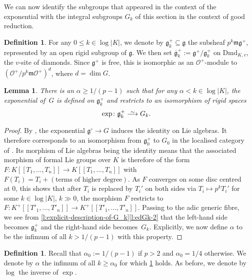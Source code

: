 \documentclass[10pt,a4paper]{article}
\newtheorem{Lemma}[thm]{Lemma}
\theoremstyle{definition}
\newtheorem{Definition}[thm]{Definition}
\theoremstyle{remark}
\newcommand{\lra}{\longrightarrow}
\newcommand*{\lowsim}{\vbox to 0pt{\vss\hbox{$\scriptstyle\sim$}\vskip-2pt}}
\newcommand*{\longisomarrow}{\stackrel{\lowsim}{\lra}}
\renewcommand{\O}{\mathcal{O}}
\newcommand{\m}{\mathfrak{m}}
\newcommand{\mg}{\mathfrak{g}}
\newcommand{\Dmd}{\mathrm{Dmd}}
\numberwithin{equation}{section}
\begin{document}
We can now identify  the subgroups that appeared in the context of the exponential with the integral subgroups $G_k$ of this section in the context of good reduction. 

\begin{Definition}\label{d:mg-plus_k}
	For any $0\leq k \in \log|K|$,
	we denote by $\mathfrak g_k^+\subseteq \mg$ the subsheaf $p^{k}\m \mg^+$, represented by an open rigid subgroup of $\mathfrak g$. We then set $\overline{\mg}^+_k:=\mg^+/\mg^{+}_k$ on $\Dmd_{K,v}$, the $v$-site of diamonds. Since $\mg^+$ is free, this is isomorphic as an $\O^+$-module to $(\O^+/p^{k}\m\O^+)^d$, where $d=\dim G$.
\end{Definition}

\begin{Lemma}\label{l:exp-vs-integral-subgroups}
	There is an $\alpha\geq 1/(p-1)$ such that for any $\alpha<k\in \log|K|$, the exponential of\, $G$ is defined on $\mg^+_k$ and restricts to an isomorphism of rigid spaces
	\[ \exp\colon\mg^+_k \longisomarrow G_k.\]
\end{Lemma}

\begin{proof}
	By ,  the exponential $\mg^\circ\to G$ induces the identity on Lie algebras. It therefore corresponds to an isomorphism from $\mg^+_0$ to $G_0$ in the localised category of 
	.
	Its morphism of Lie algebras being the identity means that the associated morphism of formal Lie groups over $K$ is therefore of the form $F\colon K[[T_1,\dots,T_n]]\to K[[T_1,\dots,T_n]]$ with $F(T_i)=T_i+ (\text{terms of higher degree})$. As $F$ converges on some disc centred at $0$, this shows that after $T_i$ is replaced by $T_i'$ on both sides via $T_i\mapsto p^{k}T_i'$ for some $k\in \log|K|$, $k\gg 0$, the morphism $F$ restricts to $F\colon K^+[[T'_1,\dots,T'_n]]\to K^+[[T'_1,\dots,T'_n]]$. Passing to the adic generic fibre, we see from  \cref{l:explicit-description-of-G_k}\eqref{l:edGk-2} that the left-hand side becomes $\mg^+_k$ and the right-hand side becomes~$G_k$. Explicitly, we now define $\alpha$ to be the infimum of all $k>1/(p-1)$ with this property.
\end{proof}

\begin{Definition}
	Recall that  $\alpha_0:=1/(p-1)$ if $p>2$ and $\alpha_0=1/4$ otherwise.
	We denote by $\alpha$ the infimum of all $k\geq \alpha_0$ for which  \cref{l:exp-vs-integral-subgroups} holds. As before, we denote by $\log$ the inverse of $\exp$.
\end{Definition}
\end{document}
